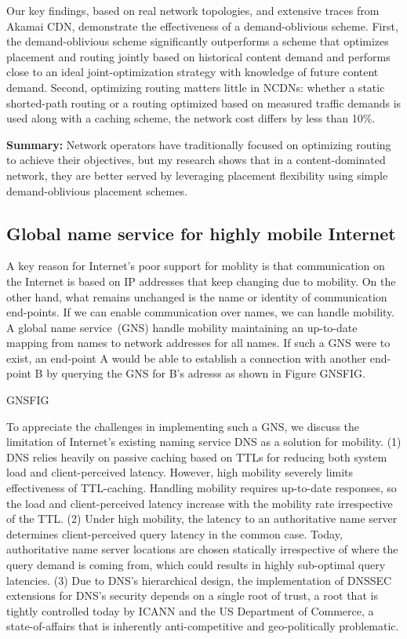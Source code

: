 Our key findings, based on real network topologies, and extensive traces from Akamai CDN, demonstrate the effectiveness of a demand-oblivious scheme. First, the demand-oblivious scheme significantly outperforms a scheme that optimizes placement and routing jointly based on historical content demand and performs close to an ideal joint-optimization strategy with knowledge of future content demand.  Second, optimizing routing matters little in NCDNs: whether a static shorted-path routing or a routing optimized based on measured traffic demands is used along with a caching scheme, the network cost differs by less than 10\%. 


\textbf{Summary:} Network operators have traditionally focused on optimizing routing to achieve their objectives, but my research shows that in a content-dominated network, they are better served by leveraging placement flexibility using simple demand-oblivious placement schemes.


\subsection{Global name service for highly mobile Internet}

A key reason for Internet's poor support for moblity is that communication on the Internet is based on IP addresses that keep changing due to mobility. On the other hand, what remains unchanged is the name or identity of communication end-points. If we can enable communication over names, we can handle mobility. A  global name service (GNS) handle mobility maintaining an up-to-date mapping from names to network addresses for all names. If such a GNS were to exist, an end-point A would be able to establish a connection with another end-point B by querying the GNS for B's adresss as shown in Figure GNSFIG. 

GNSFIG

To appreciate the challenges in implementing such a GNS, we discuss the limitation of Internet's existing naming service DNS as a solution for mobility. (1) DNS relies heavily on passive caching based on TTLs for reducing both system load and client-perceived latency. However, high mobility severely limits effectiveness of TTL-caching. Handling mobility requires up-to-date responses, so the load and client-perceived latency increase with the mobility rate irrespective of the TTL. (2) Under high mobility, the latency to an authoritative name server determines client-perceived query latency in the common case. Today, authoritative name server locations are chosen statically irrespective of where the query demand is coming from, which could results in highly sub-optimal query latencies. (3) Due to DNS's hierarchical design, the implementation of DNSSEC extensions for DNS's security depends on a single root of trust, a root that is tightly controlled today by ICANN and the US Department of Commerce, a state-of-affairs that is inherently anti-competitive and geo-politically problematic. 

